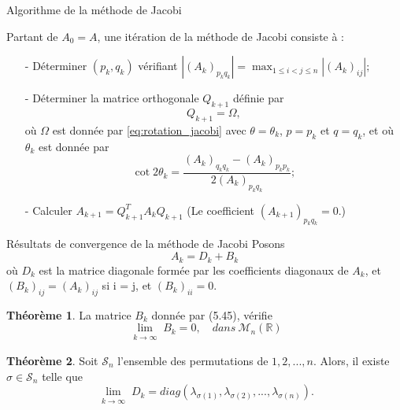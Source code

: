 \documentclass[french, 10pt]{beamer}
\theoremstyle{definition}
\newtheorem{theoreme}{Théorème}
\begin{document}
\begin{frame}{Algorithme de la méthode de Jacobi}
	
	\begin{boxV}
		Partant de $A_0=A$, une itération de la méthode de Jacobi consiste à :
		\begin{itemize}
			\item[-] Déterminer $(p_k, q_k)$ vérifiant $
			\left| (A_k)_{p_k q_k} \right| = \max_{1 \leq i < j \leq n} \left| (A_k)_{ij} \right|;
			$
			\item[-] Déterminer la matrice orthogonale $Q_{k+1}$ définie par
			\[
			Q_{k+1} = \Omega,
			\]
			où $\Omega$ est donnée par \eqref{eq:rotation_jacobi} avec $\theta = \theta_k$, $p = p_k$ et $q = q_k$, et où $\theta_k$ est donnée par
			\[
			\cot 2\theta_k = \frac{(A_k)_{q_k q_k} - (A_k)_{p_k p_k}}{2 (A_k)_{p_k q_k}};
			\]
			\item[-] Calculer $A_{k+1} = Q_{k+1}^T A_k Q_{k+1}$
			(Le coefficient $(A_{k+1})_{p_k q_k} = 0$.) 
		\end{itemize}
	\end{boxV}
\end{frame}
\begin{frame}{Résultats de convergence de la méthode de Jacobi }
	Posons $$A_k = D_k + B_k$$
	où $D_k$ est la matrice diagonale formée par les coefficients diagonaux de $A_k$, et $(B_k)_{ij} = (A_k)_{ij}$ si i = j, et $(B_k)_{ii}=0$.
	
	\begin{theoreme}
		La matrice $B_k$ donnée par (5.45), vérifie
		$$\lim \limits_{\substack{k \to \infty}}
		B_k = 0, \quad  dans~ \mathcal{M}_n(\mathbb{R})$$
	\end{theoreme}
	
	\begin{theoreme}
		Soit $\mathcal{S}_n$ l’ensemble des permutations de ${1, 2, . . . , n}.$ Alors, il existe $\sigma \in \mathcal{S}_n$  telle que
		$$\lim \limits_{\substack{k \to \infty}}
		D_k = diag(\lambda_{\sigma(1)}, \lambda_{\sigma(2)},...,\lambda_{\sigma(n)}
		).$$
	\end{theoreme}
	
	
\end{frame}
\end{document}
